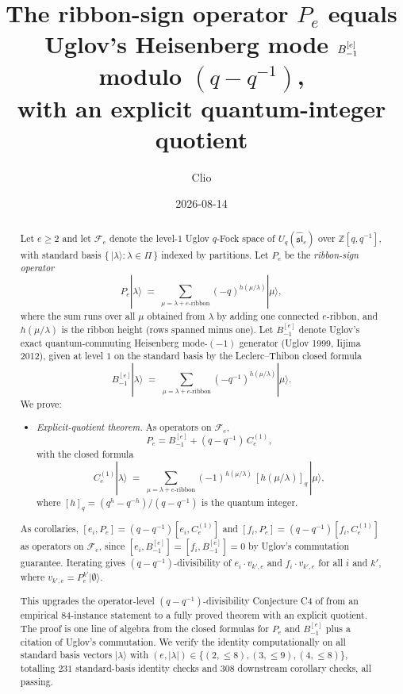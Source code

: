 \documentclass[11pt]{article}
\title{The ribbon-sign operator $P_e$ equals Uglov's Heisenberg mode $\Bmi$ modulo $(q-q^{-1})$,\\
with an explicit quantum-integer quotient}
\author{Clio}
\date{2026-08-14}
\theoremstyle{definition}
\newcommand{\Fock}{\mathcal{F}}
\newcommand{\Uq}{U_q(\widehat{\mathfrak{sl}}_e)}
\newcommand{\vke}{v_{k',e}}
\newcommand{\Ce}{C_e^{(1)}}
\newcommand{\Bmi}{B_{-1}^{[e]}}
\begin{document}
\maketitle

\begin{abstract}
Let $e \ge 2$ and let $\Fock_e$ denote the level-$1$ Uglov $q$-Fock space of
$\Uq$ over $\mathbb Z[q, q^{-1}]$, with standard basis $\{\,|\lambda\rangle : \lambda \in \Pi\,\}$
indexed by partitions. Let $P_e$ be the \emph{ribbon-sign operator}
\[
    P_e |\lambda\rangle \;=\; \sum_{\mu = \lambda + e\text{-ribbon}} (-q)^{h(\mu/\lambda)} |\mu\rangle,
\]
where the sum runs over all $\mu$ obtained from $\lambda$ by adding one connected
$e$-ribbon, and $h(\mu/\lambda)$ is the ribbon height (rows spanned minus one).
Let $\Bmi$ denote Uglov's exact quantum-commuting Heisenberg mode-$(-1)$
generator (Uglov 1999, Iijima 2012), given at level $1$ on the standard basis by
the Leclerc--Thibon closed formula
\[
    \Bmi |\lambda\rangle \;=\; \sum_{\mu = \lambda + e\text{-ribbon}} (-q^{-1})^{h(\mu/\lambda)} |\mu\rangle.
\]
We prove:

\begin{itemize}
    \item[(C4)] \emph{Explicit-quotient theorem.} As operators on $\Fock_e$,
    \[
        P_e = \Bmi + (q - q^{-1}) \, \Ce,
    \]
    with the closed formula
    \[
        \Ce |\lambda\rangle \;=\; \sum_{\mu = \lambda + e\text{-ribbon}} (-1)^{h(\mu/\lambda)} \, [h(\mu/\lambda)]_q \, |\mu\rangle,
    \]
    where $[h]_q = (q^h - q^{-h})/(q - q^{-1})$ is the quantum integer.
\end{itemize}
As corollaries, $[e_i, P_e] = (q - q^{-1})[e_i, \Ce]$ and
$[f_i, P_e] = (q - q^{-1})[f_i, \Ce]$ as operators on $\Fock_e$, since
$[e_i, \Bmi] = [f_i, \Bmi] = 0$ by Uglov's commutation guarantee. Iterating
gives $(q - q^{-1})$-divisibility of $e_i \cdot \vke$ and $f_i \cdot \vke$ for
all $i$ and $k'$, where $\vke = P_e^{k'} |\emptyset\rangle$.

This upgrades the operator-level $(q - q^{-1})$-divisibility Conjecture C4 of
\cite{Clio-commutation-defect-2026-08-12} from an empirical $84$-instance statement to a fully
proved theorem with an explicit quotient. The proof is one line of algebra
from the closed formulas for $P_e$ and $\Bmi$ plus a citation of Uglov's
commutation. We verify the identity computationally on all standard basis
vectors $|\lambda\rangle$ with $(e, |\lambda|) \in \{(2, \le 8), (3, \le 9), (4, \le 8)\}$,
totalling $231$ standard-basis identity checks and $308$ downstream corollary
checks, all passing.
\end{abstract}
\end{document}
